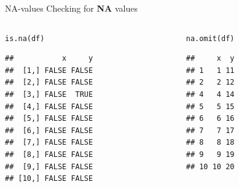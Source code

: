 \documentclass[xcolor=table,           xcolor=dvipsnames]{beamer}\usepackage[]{graphicx}\usepackage[]{color}
\makeatletter
\newcommand{\hlnum}[1]{\textcolor[rgb]{0,0,0}{#1}}
\newcommand{\hlstr}[1]{\textcolor[rgb]{0.545,0.137,0.137}{#1}}
\newcommand{\hlopt}[1]{\textcolor[rgb]{0,0,0}{#1}}
\newcommand{\hlstd}[1]{\textcolor[rgb]{0,0,0}{#1}}
\newcommand{\hlkwc}[1]{\textcolor[rgb]{1,0,1}{#1}}
\newcommand{\hlkwd}[1]{\textcolor[rgb]{0,0,1}{#1}}
\newenvironment{kframe}{%
 \def\at@end@of@kframe{}%
 \ifinner\ifhmode%
  \def\at@end@of@kframe{\end{minipage}}%
  \begin{minipage}{\columnwidth}%
 \fi\fi%
 \def\FrameCommand##1{\hskip\@totalleftmargin \hskip-\fboxsep
 \colorbox{shadecolor}{##1}\hskip-\fboxsep
     \hskip-\linewidth \hskip-\@totalleftmargin \hskip\columnwidth}%
 \MakeFramed {\advance\hsize-\width
   \@totalleftmargin\z@ \linewidth\hsize
   \@setminipage}}%
 {\par\unskip\endMakeFramed%
 \at@end@of@kframe}
\newenvironment{knitrout}{}{} %
\makeatother
\begin{document}



\begin{frame}[fragile]{NA-values}
	Checking for \textbf{NA} values
	\begin{columns}
	\begin{column}{.48\textwidth}

\begin{knitrout}
\color{fgcolor}\begin{kframe}
\begin{alltt}
\hlkwd{is.na}\hlstd{(df)}
\end{alltt}
\begin{verbatim}
##           x     y
##  [1,] FALSE FALSE
##  [2,] FALSE FALSE
##  [3,] FALSE  TRUE
##  [4,] FALSE FALSE
##  [5,] FALSE FALSE
##  [6,] FALSE FALSE
##  [7,] FALSE FALSE
##  [8,] FALSE FALSE
##  [9,] FALSE FALSE
## [10,] FALSE FALSE
\end{verbatim}
\end{kframe}
\end{knitrout}
	\end{column}
	\hfill
	\pause
	\begin{column}{.48\textwidth}
\begin{knitrout}
\color{fgcolor}\begin{kframe}
\begin{alltt}
\hlkwd{na.omit}\hlstd{(df)}
\end{alltt}
\begin{verbatim}
##     x  y
## 1   1 11
## 2   2 12
## 4   4 14
## 5   5 15
## 6   6 16
## 7   7 17
## 8   8 18
## 9   9 19
## 10 10 20
\end{verbatim}
\end{kframe}
\end{knitrout}
	\end{column}
	\end{columns}
\end{frame}
\end{document}
